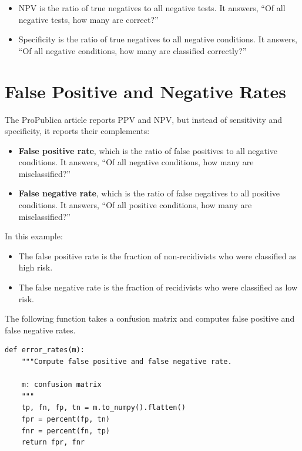 \begin{itemize}
\item
  NPV is the ratio of true negatives to all negative tests. It answers,
  ``Of all negative tests, how many are correct?''
\item
  Specificity is the ratio of true negatives to all negative conditions.
  It answers, ``Of all negative conditions, how many are classified
  correctly?''
\end{itemize}

\hypertarget{false-positive-and-negative-rates}{%
\section{False Positive and Negative
Rates}\label{false-positive-and-negative-rates}}

The ProPublica article reports PPV and NPV, but instead of sensitivity
and specificity, it reports their complements:

\begin{itemize}
\item
  \textbf{False positive rate}, which is the ratio of false positives to
  all negative conditions. It answers, ``Of all negative conditions, how
  many are misclassified?''
\item
  \textbf{False negative rate}, which is the ratio of false negatives to
  all positive conditions. It answers, ``Of all positive conditions, how
  many are misclassified?''
\end{itemize}

In this example:

\begin{itemize}
\item
  The false positive rate is the fraction of non-recidivists who were
  classified as high risk.
\item
  The false negative rate is the fraction of recidivists who were
  classified as low risk.
\end{itemize}

The following function takes a confusion matrix and computes false
positive and false negative rates.

\begin{lstlisting}[]
def error_rates(m):
    """Compute false positive and false negative rate.
    
    m: confusion matrix
    """
    tp, fn, fp, tn = m.to_numpy().flatten()
    fpr = percent(fp, tn)
    fnr = percent(fn, tp)
    return fpr, fnr
\end{lstlisting}

